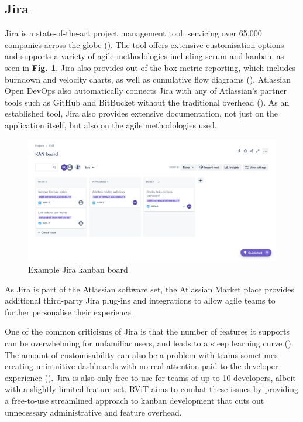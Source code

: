 \documentclass[l4proj.tex]{subfiles}
\begin{document}
\subsection{Jira}
Jira is a state-of-the-art project management tool, servicing over 65,000 companies across the globe (\cite{JiraUsers}). The tool offers extensive customisation options and supports a variety of agile methodologies including scrum and kanban, as seen in \textbf{Fig. \ref{fig:Jira kanban}}.
Jira also provides out-of-the-box metric reporting, which includes burndown and velocity charts, as well as cumulative flow diagrams (\cite{JiraReports}). Atlassian Open DevOps also automatically connects Jira with any of Atlassian's partner tools such as GitHub and BitBucket without the traditional overhead (\cite{JiraDevOps}). As an established tool, Jira also provides extensive documentation, not just on the application itself, but also on the agile methodologies used.

\begin{figure}[h!]
\begin{center}
\includegraphics[scale=0.27]{dissertation/images/JiraKanbanBoard.png}
\caption{Example Jira kanban board}
\label{fig:Jira kanban} 
\end{center}
\end{figure}

As Jira is part of the Atlassian software set, the Atlassian Market place provides additional third-party Jira plug-ins and integrations to allow agile teams to further personalise their experience.  

One of the common criticisms of Jira is that the number of features it supports can be overwhelming for unfamiliar users, and leads to a steep learning curve (\cite{JiraProblemsFeatures}). The amount of customisability can also be a problem with teams sometimes creating unintuitive dashboards with no real attention paid to the developer experience (\cite{JiraProblemsFlexible}). Jira is also only free to use for teams of up to 10 developers, albeit with a slightly limited feature set. RViT aims to combat these issues by providing a free-to-use streamlined approach to kanban development that cuts out unnecessary administrative and feature overhead.
\end{document}
